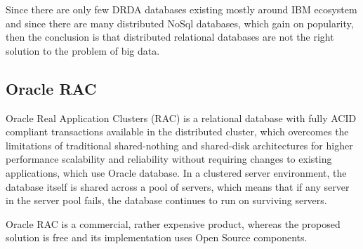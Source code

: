 Since there are only few DRDA databases existing mostly around IBM ecosystem and since there are many distributed NoSql databases, which gain on popularity, then the conclusion is that distributed relational databases are not the right solution to the problem of big data.

\subsection{Oracle RAC}
Oracle Real Application Clusters (RAC) is a relational database with fully ACID compliant transactions available in the distributed cluster, which overcomes the limitations of traditional shared-nothing and
shared-disk architectures for higher performance scalability and
reliability without requiring changes to existing applications, which use Oracle database.
In a clustered server environment, the database
itself is shared across a pool of servers, which means that if any server in the server pool fails,
the database continues to run on surviving servers.

 Oracle RAC is a commercial, rather expensive product, whereas the proposed solution is free and its implementation uses Open Source components.

